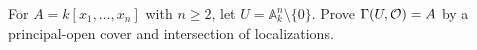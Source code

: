 \begin{problem}\label{chal:vi17-c02}
For $A=k[x_1,\dots,x_n]$ with $n\ge2$, let $U=\mathbb A^n_k\setminus\{0\}$.  Prove $\Gamma(U,\mathcal O)=A$ by a principal-open cover and intersection of localizations.
\end{problem}
